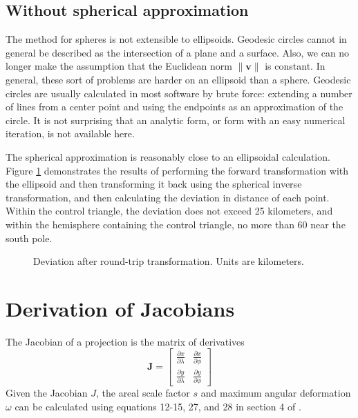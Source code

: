 \documentclass{amsart}[12pt]
\begin{document}
\subsection{Without spherical approximation}
The method for spheres is not extensible to ellipsoids. Geodesic
circles cannot in general be described as the intersection of a plane and a
surface. Also, we can no longer make the assumption that the Euclidean norm
$\|\mathbf v\|$ is constant. In general, these sort of problems are harder on
an ellipsoid than a sphere. Geodesic circles are usually calculated in most
software by brute force: extending a number of lines from a center point and
using the endpoints as an approximation of the circle.\cite{idfk}
It is not surprising that an analytic form,
or form with an easy numerical iteration, is not available here.

The spherical approximation is reasonably close to an ellipsoidal
calculation. Figure \ref{fig:roundtrip} demonstrates the results of performing
the forward transformation with the ellipsoid and then transforming it back
using the spherical inverse transformation, and then calculating the deviation
in distance of each point. Within the control triangle, the
deviation does not exceed 25 kilometers, and within the hemisphere containing the
control triangle, no more than 60 near the south pole.

\begin{figure}%

\caption{Deviation after round-trip transformation. Units are kilometers.}
\label{fig:roundtrip}
\end{figure}

\section{Derivation of Jacobians}
The Jacobian of a projection is the matrix of derivatives
\begin{equation}
  \mathbf{J} =
  \begin{bmatrix}
    \frac{\partial x}{\partial \lambda} &
    \frac{\partial x}{\partial \phi} \\
    \frac{\partial y}{\partial \lambda} &
    \frac{\partial y}{\partial \phi}
  \end{bmatrix}
\end{equation}
Given the Jacobian $J$, the areal scale factor $s$ and maximum angular deformation
$\omega$ can be calculated using equations 12-15, 27, and 28 in section 4 of
\cite{snyder87}.
\end{document}
